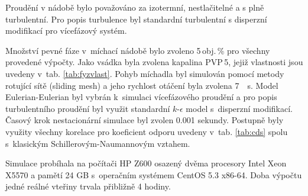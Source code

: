 Proudění v nádobě bylo považováno za izotermní, nestlačitelné a s plně turbulentní. Pro popis turbulence byl standardní \keps{} turbulentní s disperzní modifikací pro vícefázový systém.



Množství pevné fáze v~míchací nádobě bylo zvoleno 5\,obj.\,\% pro všechny provedené výpočty. Jako vsádka byla zvolena kapalina PVP\,5, jejiž vlastnosti jsou uvedeny v~tab. \ref{tab:fyzvlast}. Pohyb míchadla byl simulován pomocí metody rotující sítě (sliding mesh) a jeho rychlost otáčení byla zvolena \SI{7}{\per\second}. Model Eulerian-Eulerian byl vybrán k~simulaci vícefázového proudění a pro popis turbulentního proudění byl využit standardní $k\mbox{-}\epsilon$ model s~disperzní modifikací. Časový krok nestacionární simulace byl zvolen \num{0.001} sekundy. Postupně byly využity všechny korelace pro koeficient odporu uvedeny v~tab. \ref{tab:cds} spolu s~klasickým Schillerovým-Naumannovým vztahem. 

Simulace probíhala na počítači HP Z600 osazený dvěma procesory Intel Xeon X5570 a pamětí 24 GB s~operačním systémem CentOS 5.3 x86-64. Doba výpočtu jedné reálné vteřiny trvala přibližně 4 hodiny.


